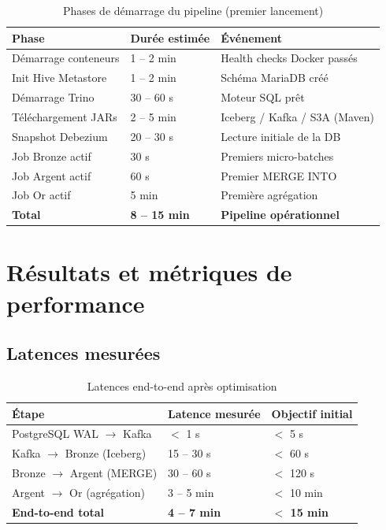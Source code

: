 \documentclass[12pt,a4paper]{report}
\begin{document}
\begin{table}[h]
\centering
\caption{Phases de démarrage du pipeline (premier lancement)}
\label{tab:startup}
\renewcommand{\arraystretch}{1.3}
\begin{tabular}{lll}
\toprule
\textbf{Phase} & \textbf{Durée estimée} & \textbf{Événement} \\
\midrule
Démarrage conteneurs   & 1 -- 2 min    & Health checks Docker passés     \\
Init Hive Metastore    & 1 -- 2 min    & Schéma MariaDB créé             \\
Démarrage Trino        & 30 -- 60 s    & Moteur SQL prêt                 \\
Téléchargement JARs    & 2 -- 5 min    & Iceberg / Kafka / S3A (Maven)   \\
Snapshot Debezium      & 20 -- 30 s    & Lecture initiale de la DB       \\
Job Bronze actif       & 30 s          & Premiers micro-batches          \\
Job Argent actif       & 60 s          & Premier MERGE INTO              \\
Job Or actif           & 5 min         & Première agrégation             \\
\midrule
\textbf{Total}         & \textbf{8 -- 15 min} & \textbf{Pipeline opérationnel} \\
\bottomrule
\end{tabular}
\end{table}

\section{Résultats et métriques de performance}

\subsection{Latences mesurées}

\begin{table}[h]
\centering
\caption{Latences end-to-end après optimisation}
\label{tab:latency}
\renewcommand{\arraystretch}{1.3}
\begin{tabular}{lll}
\toprule
\textbf{Étape} & \textbf{Latence mesurée} & \textbf{Objectif initial} \\
\midrule
PostgreSQL WAL $\to$ Kafka    & $<$ 1 s        & $<$ 5 s    \\
Kafka $\to$ Bronze (Iceberg)  & 15 -- 30 s     & $<$ 60 s   \\
Bronze $\to$ Argent (MERGE)   & 30 -- 60 s     & $<$ 120 s  \\
Argent $\to$ Or (agrégation)  & 3 -- 5 min     & $<$ 10 min \\
\textbf{End-to-end total}     & \textbf{4 -- 7 min} & \textbf{$<$ 15 min} \\
\bottomrule
\end{tabular}
\end{table}
\end{document}
